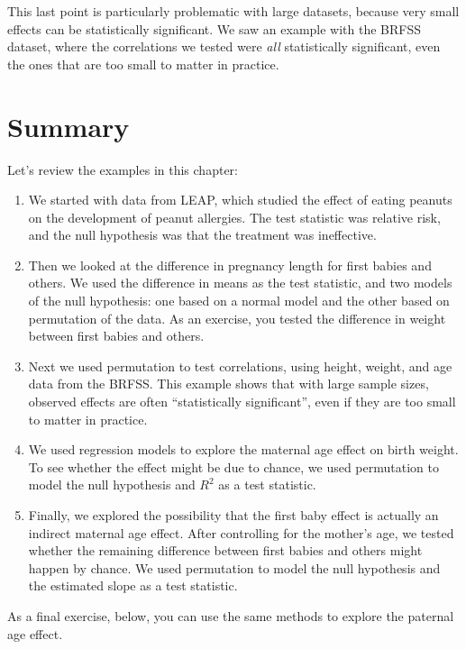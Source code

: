 This last point is particularly problematic with large datasets, because
very small effects can be statistically significant. We saw an example
with the BRFSS dataset, where the correlations we tested were \emph{all}
statistically significant, even the ones that are too small to matter in
practice.

\hypertarget{summary}{%
\section{Summary}\label{summary}}

Let's review the examples in this chapter:

\begin{enumerate}
\def\labelenumi{\arabic{enumi}.}
\item
  We started with data from LEAP, which studied the effect of eating
  peanuts on the development of peanut allergies. The test statistic was
  relative risk, and the null hypothesis was that the treatment was
  ineffective.
\item
  Then we looked at the difference in pregnancy length for first babies
  and others. We used the difference in means as the test statistic, and
  two models of the null hypothesis: one based on a normal model and the
  other based on permutation of the data. As an exercise, you tested the
  difference in weight between first babies and others.
\item
  Next we used permutation to test correlations, using height, weight,
  and age data from the BRFSS. This example shows that with large sample
  sizes, observed effects are often ``statistically significant'', even
  if they are too small to matter in practice.
\item
  We used regression models to explore the maternal age effect on birth
  weight. To see whether the effect might be due to chance, we used
  permutation to model the null hypothesis and \(R^2\) as a test
  statistic.
\item
  Finally, we explored the possibility that the first baby effect is
  actually an indirect maternal age effect. After controlling for the
  mother's age, we tested whether the remaining difference between first
  babies and others might happen by chance. We used permutation to model
  the null hypothesis and the estimated slope as a test statistic.
\end{enumerate}

As a final exercise, below, you can use the same methods to explore the
paternal age effect.

